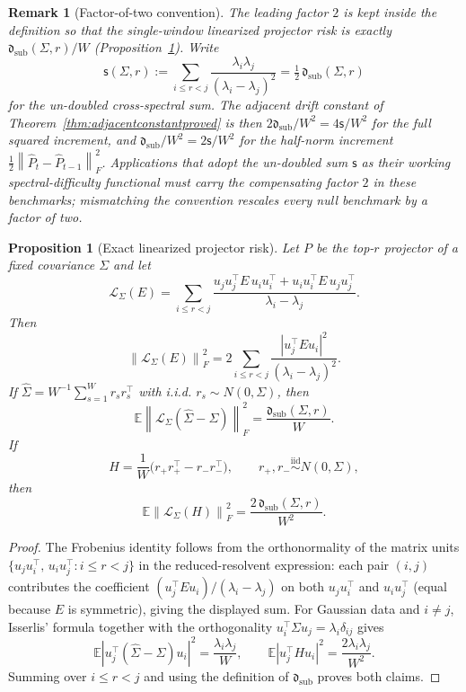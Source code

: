 \documentclass[11pt]{article}
\theoremstyle{tightplain}
\newtheorem{proposition}[theorem]{Proposition}
\theoremstyle{tightdef}
\newtheorem{remark}[theorem]{Remark}
\newcommand{\E}{\mathbb E}
\newcommand{\norm}[1]{\left\lVert #1 \right\rVert}
\newcommand{\abs}[1]{\left\lvert #1 \right\rvert}
\newcommand{\dsub}{\mathfrak d_{\mathrm{sub}}}
\newcommand{\ssum}{\mathsf s}
\newcommand{\iid}{\stackrel{\mathrm{iid}}{\sim}}
\begin{document}
\begin{remark}[Factor-of-two convention]\label{rem:convention}
The leading factor $2$ is kept \emph{inside} the definition so that the
single-window linearized projector risk is exactly
$\dsub(\Sigma,r)/W$
(Proposition~\ref{prop:dsub}). Write
\[
\ssum(\Sigma,r):=\sum_{i\le r<j}\frac{\lambda_i\lambda_j}{(\lambda_i-\lambda_j)^2}
=\tfrac12\,\dsub(\Sigma,r)
\]
for the un-doubled cross-spectral sum. The adjacent drift constant of
Theorem~\ref{thm:adjacentconstantproved} is then
$2\dsub/W^2=4\ssum/W^2$ for the full squared increment, and
$\dsub/W^2=2\ssum/W^2$ for the half-norm increment
$\tfrac12\norm{\widehat P_t-\widehat P_{t-1}}_F^2$. Applications that adopt the
un-doubled sum $\ssum$ as their working spectral-difficulty functional must
carry the compensating factor $2$ in these benchmarks; mismatching the
convention rescales every null benchmark by a factor of two.
\end{remark}

\begin{proposition}[Exact linearized projector risk]\label{prop:dsub}
Let $P$ be the top-$r$ projector of a fixed covariance $\Sigma$ and let
\[
\mathcal L_\Sigma(E)=
\sum_{i\le r<j}
\frac{u_j u_j^\top E\, u_i u_i^\top+u_i u_i^\top E\, u_j u_j^\top}{\lambda_i-\lambda_j}.
\]
Then
\[
\norm{\mathcal L_\Sigma(E)}_F^2
=2\sum_{i\le r<j}\frac{\abs{u_j^\top E u_i}^2}{(\lambda_i-\lambda_j)^2}.
\]
If $\widehat\Sigma=W^{-1}\sum_{s=1}^W r_s r_s^\top$ with i.i.d.
$r_s\sim N(0,\Sigma)$, then
\[
\E\norm{\mathcal L_\Sigma(\widehat\Sigma-\Sigma)}_F^2
=\frac{\dsub(\Sigma,r)}{W}.
\]
If
\[
H=\frac1W\bigl(r_+r_+^\top-r_-r_-^\top\bigr),
\qquad
r_+,r_-\iid N(0,\Sigma),
\]
then
\[
\E\norm{\mathcal L_\Sigma(H)}_F^2
=\frac{2\,\dsub(\Sigma,r)}{W^2}.
\]
\end{proposition}

\begin{proof}
The Frobenius identity follows from the orthonormality of the matrix units
$\{u_j u_i^\top,\,u_i u_j^\top:i\le r<j\}$ in the reduced-resolvent expression:
each pair $(i,j)$ contributes the coefficient $(u_j^\top E u_i)/(\lambda_i-\lambda_j)$
on both $u_j u_i^\top$ and $u_i u_j^\top$ (equal because $E$ is symmetric),
giving the displayed sum. For Gaussian data and $i\ne j$, Isserlis' formula
\cite{Isserlis1918,Janson1997} together with the orthogonality
$u_i^\top\Sigma u_j=\lambda_i\delta_{ij}$ gives
\[
\E\abs{u_j^\top(\widehat\Sigma-\Sigma)u_i}^2
=\frac{\lambda_i\lambda_j}{W},
\qquad
\E\abs{u_j^\top H u_i}^2
=\frac{2\lambda_i\lambda_j}{W^2}.
\]
Summing over $i\le r<j$ and using the definition of
$\mathfrak d_{\mathrm{sub}}$ proves both claims.
\end{proof}
\end{document}

